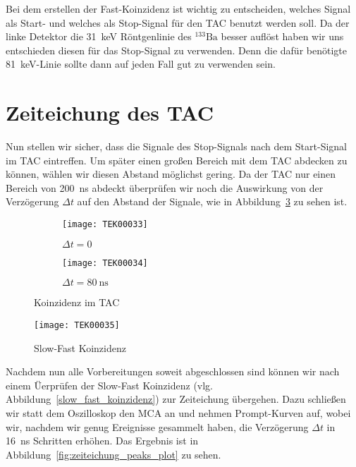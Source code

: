 \documentclass[11pt, ngerman, fleqn, DIV=15, headinclude, BCOR=2cm]{scrreprt}
\begin{document}
Bei dem erstellen der Fast-Koinzidenz ist wichtig zu entscheiden, welches
Signal als Start- und welches als Stop-Signal für den TAC benutzt werden soll.
Da der linke Detektor die \SI{31}{\kilo\electronvolt} Röntgenlinie des
$^{133}\text{Ba}$ besser auflöst haben wir uns entschieden diesen für das
Stop-Signal zu verwenden. Denn die dafür benötigte
\SI{81}{\kilo\electronvolt}-Linie sollte dann auf jeden Fall gut zu verwenden
sein.

\section{Zeiteichung des TAC}

Nun stellen wir sicher, dass die Signale des Stop-Signals nach dem Start-Signal
im TAC eintreffen. Um später einen großen Bereich mit dem TAC abdecken zu
können, wählen wir diesen Abstand möglichst gering. Da der TAC nur einen
Bereich von \SI{200}{\nano\second} abdeckt überprüfen wir noch die Auswirkung
von der Verzögerung $\Delta t$ auf den Abstand der Signale, wie in
Abbildung~\ref{fig:fast_signal_tac_koinzidenz} zu sehen ist.
\begin{figure}
	\centering
	\begin{subfigure}{0.49 \textwidth}
		\texttt{[image: TEK00033]}
		\caption{%
			$\Delta t = 0$
		}
		\label{fig:fast_signal_tac_koinzidenz-t0}
	\end{subfigure}
	\begin{subfigure}{0.49 \textwidth}
		\texttt{[image: TEK00034]}
		\caption{%
			$\Delta t = \SI{80}{\nano\second}$
		}
		\label{fig:fast_signal_tac_koinzidenz-t5-16}
	\end{subfigure}
	\caption{%
		Koinzidenz im TAC
	}
	\label{fig:fast_signal_tac_koinzidenz}
\end{figure}

\begin{figure}
	\centering
	\texttt{[image: TEK00035]}
	\caption{%
		Slow-Fast Koinzidenz
	}
	\label{fig:slow_fast_koinzidenz}
\end{figure}

Nachdem nun alle Vorbereitungen soweit abgeschlossen sind können wir nach einem
Üerprüfen der Slow-Fast Koinzidenz (vlg. Abbildung~\ref{slow_fast_koinzidenz})
zur Zeiteichung übergehen. Dazu schließen wir statt dem Oszilloskop den MCA an
und nehmen Prompt-Kurven auf, wobei wir, nachdem wir genug Ereignisse gesammelt
haben, die Verzögerung $\Delta t$ in \SI{16}{\nano\second} Schritten erhöhen.
Das Ergebnis ist in Abbildung~\ref{fig:zeiteichung_peaks_plot} zu sehen.
\end{document}
